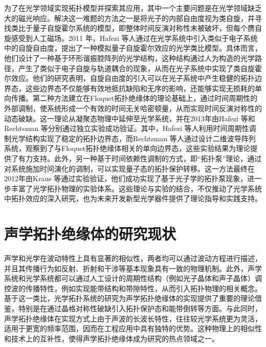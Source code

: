 为了在光学领域实现拓扑模型并探索其应用，其中一个主要问题是在光学领域缺乏大的磁光响应。解决这一难题的方法之一是将光子的内部自由度视为类自旋，并寻找类比于量子自旋霍尔系统的模型，即整体时间反演对称性未被破坏，但每个赝自旋感受到人工磁场。2011 年，Hafezi 等人通过在光学系统中引入类似于电子系统中的自旋自由度，提出了一种模拟量子自旋霍尔效应的光学类比模型\cite{g3}。具体而言，他们设计了一种基于环形谐振腔阵列的光学结构，这种结构通过人为构造的光学路径，产生了类似于电子自旋与轨道耦合的现象，从而在光子系统中实现了类自旋霍尔效应。他们的研究表明，自旋自由度的引入可以在光子系统中产生稳健的拓扑边界态，这些边界态不仅能够有效地抵抗缺陷和无序的影响，还能够实现无损耗的单向传播。第二种方法建立在Floquet拓扑绝缘体的理论基础上\cite{g4,g5}，通过时间周期性的外部调制，使系统形成一个有效的时间无关哈密顿量，从而实现时间反演对称性的动态破缺。这一理论从凝聚态物理中延伸至光学系统，并在2013年由Hafezi 等和Rechtsman 等分别通过独立实验成功验证\cite{g6,g7}。其中，Hafezi 等人利用时间周期性调制光学结构实现了稳定的拓扑边界态，而Rechtsman 等人通过设计二维波导阵列系统，观察到了与Floquet拓扑绝缘体相关的单向边界态，这些实验结果为理论提供了有力支持。此外，另一种基于时间依赖性调制的方式，即“拓扑泵”理论\cite{g8}，通过对系统施加时间演化的调制，可以实现量子态的拓扑保护转移。这一方法最终在2012年由Kraus 等通过实验验证，他们成功实现了基于光子学的拓扑泵现象，进一步丰富了光学拓扑物理的实验体系\cite{g9}。这些理论与实验的结合，不仅推动了光学系统中拓扑效应的深入研究，也为未来开发新型光学器件提供了理论指导和实践支持\cite{h1,h2,h3,h4,h5,h6,h7,h8,h9,h10,h11,h12,h13,h14,h15,h16}。

\section{声学拓扑绝缘体的研究现状}

声学和光学在波动特性上具有显著的相似性，两者均可以通过波动方程进行描述，并且其传播行为如反射、折射和干涉等基本现象具有一致的物理机制。此外，声学系统和光学系统都可以通过人工设计的周期性结构（例如光子晶体和声子晶体）调控波的传播特性，例如实现能带结构和带隙特性，从而引入拓扑物理的相关概念。基于这一类比，光学拓扑系统的研究为声学拓扑绝缘体的实现提供了重要的理论借鉴，特别是在通过晶格对称性破缺引入拓扑保护态和能带倒转等方面。与此同时，声学拓扑绝缘体在实现方式上由于声波的长波长特性，往往较光学系统更为灵活，适用于更宽的频率范围，因而在工程应用中具有独特的优势。这种物理上的相似性和技术上的互补性，使得声学拓扑绝缘体成为研究的热点领域之一。

